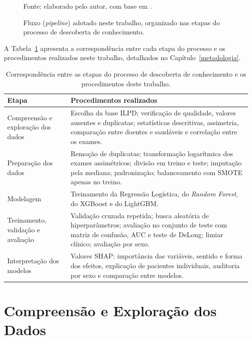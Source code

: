 \begin{figure}[htbp]
\caption{Fluxo (\textit{pipeline}) adotado neste trabalho, organizado nas etapas do processo de descoberta de conhecimento.}
\label{fig:fund_kdd}
{\small Fonte: elaborado pelo autor, com base em .}
\end{figure}

A Tabela~\ref{tab:fund_kdd} apresenta a correspondência entre cada etapa do processo e os procedimentos realizados neste trabalho, detalhados no Capítulo~\ref{metodologia}.

\begin{table}[htbp]
\centering
\begin{tabular}{>{\raggedright\arraybackslash}p{4.2cm}>{\raggedright\arraybackslash}p{9.8cm}}
\hline
\textbf{Etapa} & \textbf{Procedimentos realizados} \\
\hline
Compreensão e exploração dos dados & Escolha da base ILPD; verificação de qualidade, valores ausentes e duplicatas; estatísticas descritivas, assimetria, comparação entre doentes e saudáveis e correlação entre os exames. \\[0.1cm]
Preparação dos dados & Remoção de duplicatas; transformação logarítmica dos exames assimétricos; divisão em treino e teste; imputação pela mediana; padronização; balanceamento com SMOTE apenas no treino. \\[0.1cm]
Modelagem & Treinamento da Regressão Logística, do \textit{Random Forest}, do XGBoost e do LightGBM. \\[0.1cm]
Treinamento, validação e avaliação & Validação cruzada repetida; busca aleatória de hiperparâmetros; avaliação no conjunto de teste com matriz de confusão, AUC e teste de DeLong; limiar clínico; avaliação por sexo. \\[0.1cm]
Interpretação dos modelos & Valores SHAP: importância das variáveis, sentido e forma dos efeitos, explicação de pacientes individuais, auditoria por sexo e comparação entre modelos. \\
\hline
\end{tabular}
\caption{Correspondência entre as etapas do processo de descoberta de conhecimento e os procedimentos deste trabalho.}
\label{tab:fund_kdd}
\par\vspace{2pt}{\small Fonte: elaborado pelo autor.}
\end{table}

\section{Compreensão e Exploração dos Dados}
\label{sec:fund_estatistica}

